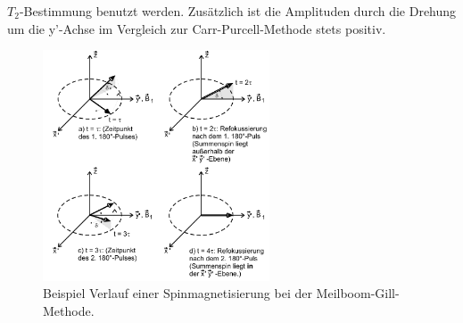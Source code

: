 $T_2$-Bestimmung benutzt werden.
Zusätzlich ist die Amplituden durch die Drehung
um die y'-Achse im Vergleich zur Carr-Purcell-Methode stets positiv.
\begin{figure}
  \centering
  \centering
  \includegraphics[width=0.6\textwidth]{mei-gil.PNG}
  \caption{Beispiel Verlauf einer Spinmagnetisierung bei
  der Meilboom-Gill-Methode.\cite{sample}}
  \label{fig:mei-gil}
\end{figure}
